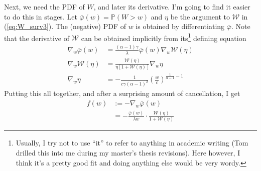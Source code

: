 \documentclass{article}
\newcommand{\bP}{\mathbb{P}}
\newcommand{\sW}{\mathscr{W}}
\begin{document}
Next, we need the PDF of $W$, and later its derivative. I'm going to find it easier to do this in stages. Let $\bar{\varphi}(w) = \bP(W > w)$ and $\eta$ be the argument to $\sW$ in (\ref{eq:W_surv3}). The (negative) PDF of $w$ is obtained by differentiating $\bar{\varphi}$. Note that the derivative of $\sW$ can be obtained implicitly from its\footnote{Usually, I try not to use ``it'' to refer to anything in academic writing (Tom drilled this into me during my master's thesis revisions). Here however, I think it's a pretty good fit and doing anything else would be very wordy.} defining equation
%
\begin{align}
    \nabla_w \bar{\varphi}(w) &=  \frac{(\alpha - 1) \gamma}{\lambda} \bar{\varphi}(w) \nabla_w \sW (\eta)\\
    \nabla_w \sW(\eta) &= \frac{\sW(\eta)}{\eta [ 1 + \sW(\eta)]} \nabla_w \eta\\
    \nabla_w \eta &= - \frac{1}{c \gamma (\alpha - 1)^2} \left( \frac{w}{c} \right)^{\frac{1}{\alpha - 1} - 1}
\end{align}
%
Putting this all together, and after a surprising amount of cancellation, I get
%
\begin{align}
    f(w) &:= -\nabla_w \bar{\varphi}(w)\\
    &= - \frac{\bar{\varphi}(w)}{\lambda w} \cdot \frac{\sW(\eta)}{1 + \sW(\eta)}
\end{align}




\end{document}
